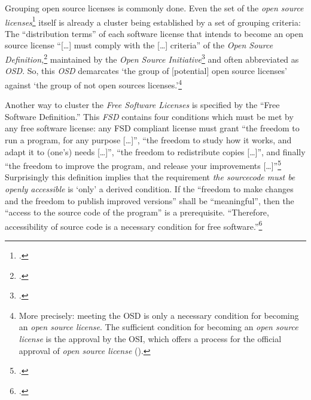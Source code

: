 Grouping open source licenses is commonly done. Even the set of the \emph{open
source li\-cen\-ses}\footcite[cf.][\nopage wp]{OSI2012b} itself is already a
cluster being established by a set of grouping criteria: The
\enquote{distribution terms} of each software license that intends to become an
open source license \enquote{[\ldots] must comply with the [\ldots] criteria}
of the \emph{Open Source De\-fi\-ni\-tion,}\footcite[cf.][\nopage wp]{OSI2012a}
maintained by the \emph{Open Source Initiative}\footcite[cf.][\nopage
wp]{OSI2012c} and often abbreviated as \emph{OSD}. So, this \emph{OSD}
demarcates `the group of [potential] open source licenses' against `the group of
not open sources licenses.'\footnote{More precisely: meeting the
OSD is only a necessary condition for becoming an \emph{open source license}. The
sufficient condition for becoming an \emph{open source license} is the approval
by the OSI, which offers a process for the official approval of \emph{open
source license} (\cite[cf.][\nopage wp]{OSI2012d}).}

Another way to cluster the \emph{Free Software Licenses} is specified by the
\enquote{Free Software Definition.} This \emph{FSD} contains four conditions
which must be met by any free software license: any FSD compliant license must
grant \enquote{the freedom to run a program, for any purpose [\ldots]},
\enquote{the freedom to study how it works, and adapt it to (one's) needs
[\ldots]}, \enquote{the freedom to redistribute copies [\ldots]}, and finally
\enquote{the freedom to improve the program, and release your improvements
[\ldots]}\footcite[cf.][41]{Stallman1996a} Surprisingly this definition
implies that the requirement \emph{the sourcecode must be openly accessible}
is `only' a derived condition. If the \enquote{freedom to make changes and the
freedom to publish improved versions} shall be \enquote{meaningful}, then the
\enquote{access to the source code of the program} is a prerequisite.
\enquote{Therefore, accessibility of source code is a necessary condition for
free software.}\footcite[cf.][41]{Stallman1996a}

